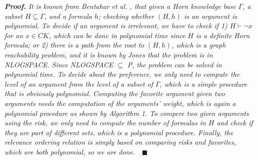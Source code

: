 \noindent\emph{\textbf{Proof.}} \emph{It is known from Bentahar et al. \cite{BentaharIEEEIS2007}, that given a Horn knowledge base
$\Gamma$, a subset $H \subseteq \Gamma$, and a formula $h$; checking whether $(H, h)$ is an argument is polynomial. To decide
if an argument is irrelevant, we have to check if 1) $H \vdash \neg x$ for an $x \in CK$, which can be done in polynomial time
since $H$ is a definite Horn formula; or 2) there is a path from the root to $(H, h)$, which is a graph reachability problem, and
it is known by Jones \cite{Jones} that the problem is in NLOGSPACE. Since NLOGSPACE $\subseteq$ P, the problem can be
solved in polynomial time. To decide about the preference, we only need to compute the level of an argument from the level of a
subset of $\Gamma$, which is  a simple procedure that is obviously polynomial. Computing the favorite argument given two arguments
needs the computation of the arguments' weight, which is again a polynomial procedure as shown by Algorithm 1. To compere two given
arguments using the risk, we only need to compute the number of formulas in $H$ and check if they are part of different sets,
which is a polynomial procedure. Finally, the relevance ordering relation is simply based on comparing risks and favorites, which
are both polynomial, so we are done.}~~$\blacksquare$









